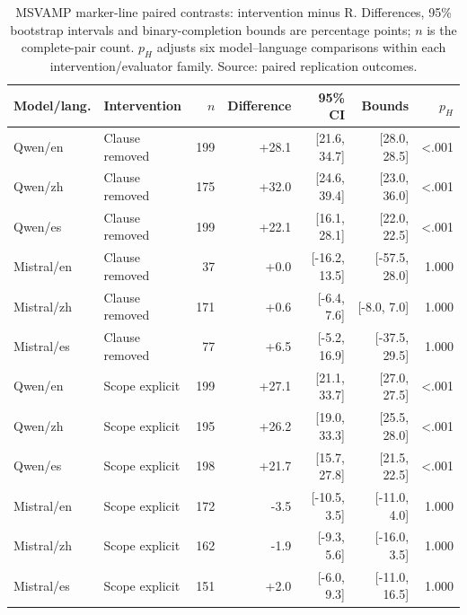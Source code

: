 \begin{table}[!htbp]\centering\small
\caption{MSVAMP marker-line paired contrasts: intervention minus R. Differences, 95\% bootstrap intervals and binary-completion bounds are percentage points; $n$ is the complete-pair count. $p_H$ adjusts six model--language comparisons within each intervention/evaluator family. Source: paired replication outcomes.}
\label{tab:replication_marker_line}
\begin{tabular}{@{}llrrrrr@{}}\toprule
Model/lang. & Intervention & $n$ & Difference & 95\% CI & Bounds & $p_H$ \\\midrule
Qwen/en & Clause removed & 199 & +28.1 & [21.6, 34.7] & [28.0, 28.5] & <.001 \\
Qwen/zh & Clause removed & 175 & +32.0 & [24.6, 39.4] & [23.0, 36.0] & <.001 \\
Qwen/es & Clause removed & 199 & +22.1 & [16.1, 28.1] & [22.0, 22.5] & <.001 \\
Mistral/en & Clause removed & 37 & +0.0 & [-16.2, 13.5] & [-57.5, 28.0] & 1.000 \\
Mistral/zh & Clause removed & 171 & +0.6 & [-6.4, 7.6] & [-8.0, 7.0] & 1.000 \\
Mistral/es & Clause removed & 77 & +6.5 & [-5.2, 16.9] & [-37.5, 29.5] & 1.000 \\
Qwen/en & Scope explicit & 199 & +27.1 & [21.1, 33.7] & [27.0, 27.5] & <.001 \\
Qwen/zh & Scope explicit & 195 & +26.2 & [19.0, 33.3] & [25.5, 28.0] & <.001 \\
Qwen/es & Scope explicit & 198 & +21.7 & [15.7, 27.8] & [21.5, 22.5] & <.001 \\
Mistral/en & Scope explicit & 172 & -3.5 & [-10.5, 3.5] & [-11.0, 4.0] & 1.000 \\
Mistral/zh & Scope explicit & 162 & -1.9 & [-9.3, 5.6] & [-16.0, 3.5] & 1.000 \\
Mistral/es & Scope explicit & 151 & +2.0 & [-6.0, 9.3] & [-11.0, 16.5] & 1.000 \\
\bottomrule\end{tabular}\end{table}
